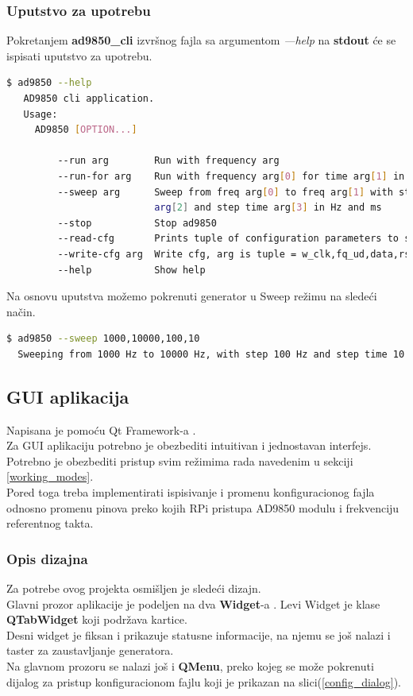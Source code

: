 \subsubsection{Uputstvo za upotrebu}

Pokretanjem \textbf{ad9850\_cli} izvršnog fajla sa argumentom \emph{---help} na
\textbf{stdout} će se ispisati uputstvo za upotrebu. \\

\begin{lstlisting}[language=bash, caption=ad9850\_cli help opcija]
   $ ad9850 --help
   AD9850 cli application.
   Usage:
     AD9850 [OPTION...]

         --run arg        Run with frequency arg
         --run-for arg    Run with frequency arg[0] for time arg[1] in ms
         --sweep arg      Sweep from freq arg[0] to freq arg[1] with step freq
                          arg[2] and step time arg[3] in Hz and ms
         --stop           Stop ad9850
         --read-cfg       Prints tuple of configuration parameters to stdout
         --write-cfg arg  Write cfg, arg is tuple = w_clk,fq_ud,data,rst,dds_clk
         --help           Show help

\end{lstlisting} %

Na osnovu uputstva možemo pokrenuti generator u Sweep režimu na sledeći način.

\begin{lstlisting}[language=bash, caption=ad9850\_cli sweep opcija]
  $ ad9850 --sweep 1000,10000,100,10
  Sweeping from 1000 Hz to 10000 Hz, with step 100 Hz and step time 10 ms
\end{lstlisting} %
\subsection{GUI aplikacija}

Napisana je pomoću Qt Framework-a \cite{qt}. \\
Za GUI aplikaciju potrebno je obezbediti intuitivan i jednostavan interfejs.
Potrebno je obezbediti pristup svim režimima rada navedenim u sekciji
\ref{working_modes}. \\
Pored toga treba implementirati ispisivanje i promenu konfiguracionog fajla odnosno
promenu pinova preko kojih RPi pristupa AD9850 modulu i frekvenciju referentnog takta.

\subsubsection{Opis dizajna}
Za potrebe ovog projekta osmišljen je sledeći dizajn. \\
Glavni prozor aplikacije je podeljen na dva \textbf{Widget}-a \cite{QWidget}.
Levi Widget je klase \textbf{QTabWidget} koji podržava kartice. \\
Desni widget je fiksan i prikazuje statusne informacije, na njemu se još nalazi
i taster za zaustavljanje generatora. \\
Na glavnom prozoru se nalazi još i \textbf{QMenu}\cite{QMenu}, preko kojeg se
može pokrenuti dijalog za pristup konfiguracionom fajlu koji je prikazan na
slici(\ref{config_dialog}). \\

